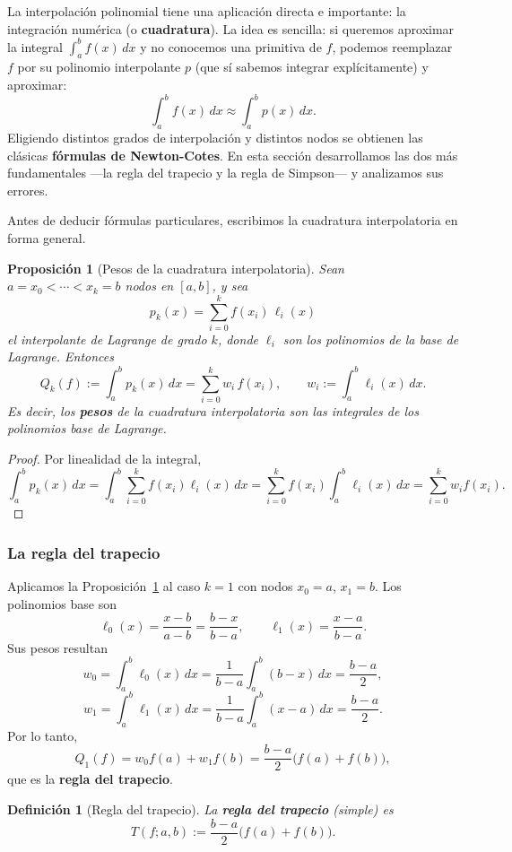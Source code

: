 \documentclass[a4paper,11pt]{report}
\newtheorem{definition}[theorem]{Definición}
\newtheorem{proposition}[theorem]{Proposición}
\begin{document}
La interpolación polinomial tiene una aplicación directa e importante: la integración numérica (o \textbf{cuadratura}).  La idea es sencilla: si queremos aproximar la integral $\int_a^b f(x)\,dx$ y no conocemos una primitiva de $f$, podemos reemplazar $f$ por su polinomio interpolante $p$ (que sí sabemos integrar explícitamente) y aproximar:
\[
\int_a^b f(x)\,dx \approx \int_a^b p(x)\,dx.
\]
Eligiendo distintos grados de interpolación y distintos nodos se obtienen las clásicas \textbf{fórmulas de Newton-Cotes}.  En esta sección desarrollamos las dos más fundamentales ---la regla del trapecio y la regla de Simpson--- y analizamos sus errores.

Antes de deducir fórmulas particulares, escribimos la cuadratura interpolatoria en forma general.

\begin{proposition}[Pesos de la cuadratura interpolatoria]\label{prop:pesos_cuadratura_interpolatoria}
Sean $a=x_0<\cdots<x_k=b$ nodos en $[a,b]$, y sea
\[
p_k(x)=\sum_{i=0}^k f(x_i)\,\ell_i(x)
\]
el interpolante de Lagrange de grado $k$, donde $\ell_i$ son los polinomios de la base de Lagrange.  Entonces
\[
Q_k(f):=\int_a^b p_k(x)\,dx=\sum_{i=0}^k w_i\,f(x_i),
\qquad
w_i:=\int_a^b \ell_i(x)\,dx.
\]
Es decir, los \textbf{pesos} de la cuadratura interpolatoria son las integrales de los polinomios base de Lagrange.
\end{proposition}
\begin{proof}
Por linealidad de la integral,
\[
\int_a^b p_k(x)\,dx
=\int_a^b\sum_{i=0}^k f(x_i)\ell_i(x)\,dx
=\sum_{i=0}^k f(x_i)\int_a^b\ell_i(x)\,dx
=\sum_{i=0}^k w_i f(x_i).
\]
\end{proof}

\subsubsection{La regla del trapecio}\label{subsec:regla_trapecio}

Aplicamos la Proposición~\ref{prop:pesos_cuadratura_interpolatoria} al caso $k=1$ con nodos $x_0=a$, $x_1=b$.  Los polinomios base son
\[
\ell_0(x)=\frac{x-b}{a-b}=\frac{b-x}{b-a},
\qquad
\ell_1(x)=\frac{x-a}{b-a}.
\]
Sus pesos resultan
\[
w_0=\int_a^b \ell_0(x)\,dx
=\frac{1}{b-a}\int_a^b (b-x)\,dx
=\frac{b-a}{2},
\]
\[
w_1=\int_a^b \ell_1(x)\,dx
=\frac{1}{b-a}\int_a^b (x-a)\,dx
=\frac{b-a}{2}.
\]
Por lo tanto,
\[
Q_1(f)=w_0f(a)+w_1f(b)=\frac{b-a}{2}\bigl(f(a)+f(b)\bigr),
\]
que es la \textbf{regla del trapecio}.

\begin{definition}[Regla del trapecio]\label{def:regla_trapecio}
La \textbf{regla del trapecio} (simple) es
\[
T(f;a,b) := \frac{b-a}{2}\bigl(f(a)+f(b)\bigr).
\]
\end{definition}
\end{document}

